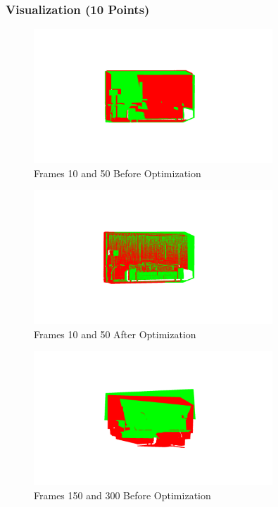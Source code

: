 \documentclass[12pt, a4paper]{article}
\begin{document}
\subsubsection{Visualization (10 Points)}
\begin{figure}[!htb]
    \centering
    \includegraphics[width=0.8\textwidth]{Before_1_50.png}
    \caption{Frames 10 and 50 Before Optimization}
\end{figure}
\begin{figure}[!htb]
    \centering
    \includegraphics[width=0.8\textwidth]{After_1_50.png}
    \caption{Frames 10 and 50 After Optimization}
\end{figure}
\clearpage
\begin{figure}[!htb]
    \centering
    \includegraphics[width=0.8\textwidth]{150_300_Before.png}
    \caption{Frames 150 and 300 Before Optimization}
\end{figure}
\end{document}

